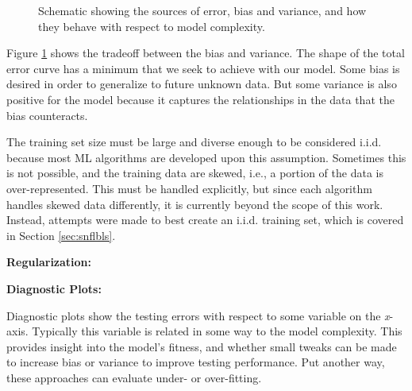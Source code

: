 \begin{figure}[!htb]
  \caption{Schematic showing the sources of error, bias and variance, and how 
           they behave with respect to model complexity.}
  \label{fig:bvtradeoff}
\end{figure}

Figure \ref{fig:bvtradeoff} shows the tradeoff between the bias and variance.
The shape of the total error curve has a minimum that we seek to achieve with
our model. Some bias is desired in order to generalize to future unknown data.
But some variance is also positive for the model because it captures the
relationships in the data that the bias counteracts. 

The training set size must be large and diverse enough to be considered
\gls{i.i.d.} because most \gls{ML} algorithms are developed upon this
assumption. Sometimes this is not possible, and the training data are skewed,
i.e., a portion of the data is over-represented. This must be handled
explicitly, but since each algorithm handles skewed data differently, it is
currently beyond the scope of this work. Instead, attempts were made to best
create an \gls{i.i.d.} training set, which is covered in Section
\ref{sec:snflbls}.

\noindent \textbf{Regularization:}

\noindent \textbf{Diagnostic Plots:} 

Diagnostic plots show the testing errors with respect to some variable on the
\textit{x}-axis.  Typically this variable is related in some way to the model
complexity. This provides insight into the model's fitness, and whether small 
tweaks can be made to increase bias or variance to improve testing performance.
Put another way, these approaches can evaluate under- or over-fitting.

